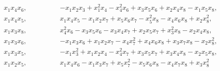 \documentclass{beamer}
\begin{document}
\begin{frame}
{\begin{align*}
x_1x_4x_6,\qquad \qquad 
&-x_1 x_2 x_3 + x_1^2 x_4 - x_4^2 x_6 + x_3 x_5 x_6 + x_2 x_4 x_8 - x_1 x_5 x_8, \\
x_1x_4x_5,\qquad \qquad 
&x_1 x_4 x_5 - x_1 x_2 x_7 + x_5 x_6 x_7 - x_5^2 x_8 - x_4 x_6 x_8 + x_2 x_8^2, \\
x_1x_3x_8,\qquad \qquad 
&x_4^2 x_6 - x_3 x_5 x_6 - x_3 x_4 x_7 + x_2 x_5 x_7 + x_3^2 x_8 - x_2 x_4 x_8, \\
x_1x_3x_6,\qquad \qquad 
&-x_1 x_3 x_6 + x_1 x_2 x_7 - x_4 x_7^2 + x_4 x_6 x_8 + x_3 x_7 x_8 - x_2 x_8^2, \\
x_1x_3x_5,\qquad \qquad 
&-x_1 x_3^2 + x_1 x_2 x_4 - x_4^2 x_7 + x_3 x_5 x_7 + x_3 x_4 x_8 - x_2 x_5 x_8, \\
x_1x_2x_5,\qquad \qquad 
&x_1 x_4 x_6 - x_1 x_3 x_7 + x_5 x_7^2 - x_5 x_6 x_8 - x_4 x_7 x_8 + x_3 x_8^2
\end{align*}}
\end{frame}
\end{document}
